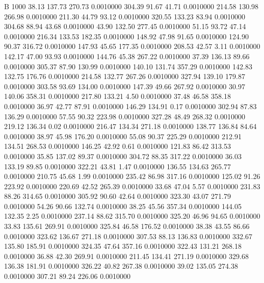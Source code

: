 


B 1000
  38.13  137.73  270.73   0.0010000
 304.39   91.67   41.71   0.0010000
 214.58  130.98  266.98   0.0010000
 211.30   44.79   93.12   0.0010000
 320.55  133.23   83.94   0.0010000
 304.68   88.94   43.68   0.0010000
  43.90  132.50  277.45   0.0010000
  51.15   93.72   47.14   0.0010000
 216.34  133.53  182.35   0.0010000
 148.92   47.98   91.65   0.0010000
 124.90   90.37  316.72   0.0010000
 147.93   45.65  177.35   0.0010000
 208.53   42.57    3.11   0.0010000
 142.17   47.00   93.93   0.0010000
 144.76   45.38  267.22   0.0010000
  37.39  136.13   89.66   0.0010000
 305.37   87.90  130.99   0.0010000
 140.10  131.74  357.29   0.0010000
 142.83  132.75  176.76   0.0010000
 214.58  132.77  267.26   0.0010000
 327.94  139.10  179.87   0.0010000
 303.58   93.69  134.00   0.0010000
 147.39   49.66  267.92   0.0010000
  30.97  140.06  358.31   0.0010000
 217.80  133.21    4.50   0.0010000
  37.48   46.58  358.18   0.0010000
  36.97   42.77   87.91   0.0010000
 146.29  134.91    0.17   0.0010000
 302.94   87.83  136.29   0.0010000
  57.55   90.32  223.98   0.0010000
 327.28   48.49  268.32   0.0010000
 219.12  136.34    0.02   0.0010000
 216.47  134.34  271.18   0.0010000
 138.77  136.84   84.64   0.0010000
  38.97   45.98  176.20   0.0010000
  55.08   90.37  225.29   0.0010000
 212.91  134.51  268.53   0.0010000
 146.25   42.92    0.61   0.0010000
 121.83   86.42  313.53   0.0010000
  35.85  137.02   89.37   0.0010000
 304.72   88.35  317.22   0.0010000
  36.03  133.19   89.85   0.0010000
 322.21   43.81    1.47   0.0010000
 136.55  134.63  265.77   0.0010000
 210.75   45.68    1.99   0.0010000
 235.42   86.98  317.16   0.0010000
 125.02   91.26  223.92   0.0010000
 220.69   42.52  265.39   0.0010000
  33.68   47.04    5.57   0.0010000
 231.83   88.26  314.65   0.0010000
 305.92   90.60   42.64   0.0010000
 323.30   43.07  271.79   0.0010000
  54.26   90.66  132.74   0.0010000
  38.25   45.56  357.34   0.0010000
 144.05  132.35    2.25   0.0010000
 237.14   88.62  315.70   0.0010000
 325.20   46.96   94.65   0.0010000
  33.83  135.61  269.91   0.0010000
 325.84   46.58  176.52   0.0010000
  38.38   43.55   86.66   0.0010000
 323.62  136.67  271.18   0.0010000
 307.53   88.13  136.83   0.0010000
 332.67  135.80  185.91   0.0010000
 324.35   47.64  357.16   0.0010000
 322.43  131.21  268.18   0.0010000
  36.88   42.30  269.91   0.0010000
 211.45  134.41  271.19   0.0010000
 329.68  136.38  181.91   0.0010000
 326.22   40.82  267.38   0.0010000
  39.02  135.05  274.38   0.0010000
 307.21   89.24  226.06   0.0010000
